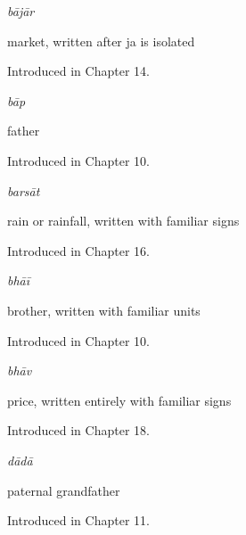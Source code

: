 \noindent\begin{minipage}[t]{\linewidth}
\raggedright
\textbf{}\enspace\emph{bājār}\par
\small market, written after ja is isolated\par
\footnotesize Introduced in Chapter 14.
\end{minipage}\par\medskip

\noindent\begin{minipage}[t]{\linewidth}
\raggedright
\textbf{}\enspace\emph{bāp}\par
\small father\par
\footnotesize Introduced in Chapter 10.
\end{minipage}\par\medskip

\noindent\begin{minipage}[t]{\linewidth}
\raggedright
\textbf{}\enspace\emph{barsāt}\par
\small rain or rainfall, written with familiar signs\par
\footnotesize Introduced in Chapter 16.
\end{minipage}\par\medskip

\noindent\begin{minipage}[t]{\linewidth}
\raggedright
\textbf{}\enspace\emph{bhāī}\par
\small brother, written with familiar units\par
\footnotesize Introduced in Chapter 10.
\end{minipage}\par\medskip

\noindent\begin{minipage}[t]{\linewidth}
\raggedright
\textbf{}\enspace\emph{bhāv}\par
\small price, written entirely with familiar signs\par
\footnotesize Introduced in Chapter 18.
\end{minipage}\par\medskip

\noindent\begin{minipage}[t]{\linewidth}
\raggedright
\textbf{}\enspace\emph{dādā}\par
\small paternal grandfather\par
\footnotesize Introduced in Chapter 11.
\end{minipage}\par\medskip

